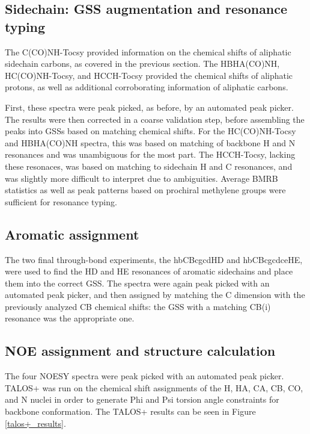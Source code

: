 \subsection*{Sidechain: GSS augmentation and resonance typing}
The C(CO)NH-Tocsy provided information on the chemical shifts of aliphatic
sidechain carbons, as covered in the previous section.  The HBHA(CO)NH, 
HC(CO)NH-Tocsy, and HCCH-Tocsy provided the chemical shifts of aliphatic
protons, as well as additional corroborating information of aliphatic carbons.

First, these spectra were peak picked, as before, by an automated peak picker.
The results were then corrected in a coarse validation step, before assembling
the peaks into GSSs based on matching chemical shifts.  For the HC(CO)NH-Tocsy
and HBHA(CO)NH spectra, this was based on matching of backbone H and N
resonances and was unambiguous for the most part.  The HCCH-Tocsy, lacking these
resonaces, was based on matching to sidechain H and C resonances, and was
slightly more difficult to interpret due to ambiguities.  
Average BMRB statistics as well as peak patterns based on prochiral methylene
groups were sufficient for resonance typing.

\subsection*{Aromatic assignment}
The two final through-bond experiments, the hbCBcgcdHD and hbCBcgcdceHE, were
used to find the HD and HE resonances of aromatic sidechains and place them
into the correct GSS.  The spectra were again peak picked with an automated
peak picker, and then assigned by matching the C dimension with the previously
analyzed CB chemical shifts: the GSS with a matching CB(i) resonance was the
appropriate one.

\subsection*{NOE assignment and structure calculation}
The four NOESY spectra were peak picked with an automated peak picker.  
TALOS+ \cite{talos+} was run on the chemical shift assignments of the H, HA,
CA, CB, CO, and N nuclei in order to generate Phi and Psi torsion angle 
constraints for backbone conformation.
The TALOS+ results can be seen in Figure \ref{talos+_results}.

